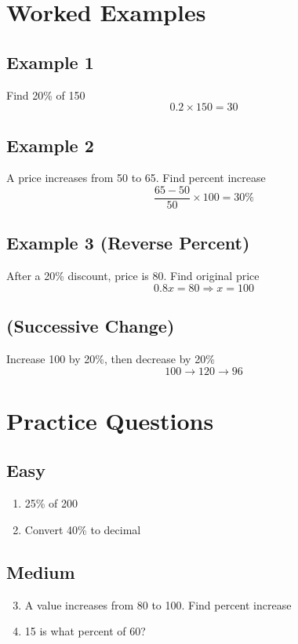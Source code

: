 \section*{Worked Examples}

\subsection*{Example 1}
Find 20\% of 150
\[
0.2 \times 150 = 30
\]

\subsection*{Example 2}
A price increases from 50 to 65. Find percent increase
\[
\frac{65 - 50}{50} \times 100 = 30\%
\]

\subsection*{Example 3 (Reverse Percent)}
After a 20\% discount, price is 80. Find original price
\[
0.8x = 80 \Rightarrow x = 100
\]

\subsection*{(Successive Change)}
Increase 100 by 20\%, then decrease by 20\%
\[
100 \rightarrow 120 \rightarrow 96
\]

\section*{Practice Questions}

\subsection*{Easy}
\begin{enumerate}
    \item 25\% of 200
    \item Convert 40\% to decimal
\end{enumerate}

\subsection*{Medium}
\begin{enumerate}
    \setcounter{enumi}{2}
    \item A value increases from 80 to 100. Find percent increase
    \item 15 is what percent of 60?
\end{enumerate}

